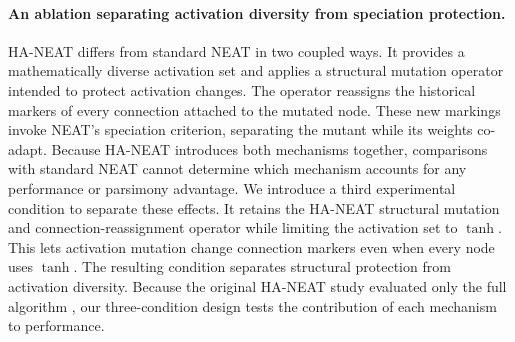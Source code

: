 \documentclass[12pt]{article}
\newcommand{\revTerm}[2]{#2}
\begin{document}

\paragraph{An ablation separating activation diversity from speciation protection.}
HA-NEAT \parencite{hagg_evolving_2017} differs from standard NEAT \parencite{stanley_evolving_2002} in two coupled ways. 
It provides \revTerm{T-02}{a mathematically diverse activation set} and applies a structural mutation operator intended to protect activation changes.
The operator \revTerm{T-12}{reassigns the historical markers} of every connection attached to the mutated node.
These new markings invoke NEAT's speciation criterion, separating the mutant while its weights co-adapt. 
Because HA-NEAT introduces both mechanisms together, comparisons with standard NEAT cannot determine which mechanism accounts for any performance or parsimony advantage.
We introduce a third experimental condition to separate these effects. 
It retains the HA-NEAT structural mutation and connection-reassignment operator while \revTerm{T-03}{limiting the activation set to} $\tanh$.
This lets activation mutation change connection markers even when every node uses $\tanh$.
The resulting condition separates structural protection from activation diversity. 
Because the original HA-NEAT study evaluated only the full algorithm \parencite{hagg_evolving_2017}, our three-condition design tests the contribution of each mechanism to performance.
\end{document}
